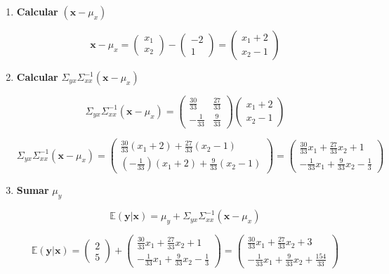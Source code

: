 \begin{enumerate}
    \item \textbf{Calcular }$(\mathbf{x} - \mu_x)$

    $$
    \mathbf{x} - \mu_x = 
    \begin{pmatrix} 
    x_1 \\ 
    x_2 
    \end{pmatrix}
    -
    \begin{pmatrix} 
    -2 \\ 
    1 
    \end{pmatrix}
    =
    \begin{pmatrix} 
    x_1 + 2 \\ 
    x_2 - 1 
    \end{pmatrix}
    $$

    \item \textbf{Calcular } $\Sigma_{yx} \Sigma_{xx}^{-1} (\mathbf{x} - \mu_x)$

    $$
    \Sigma_{yx} \Sigma_{xx}^{-1} (\mathbf{x} - \mu_x) = 
    \begin{pmatrix} 
    \frac{30}{33} & \frac{27}{33} \\ 
    -\frac{1}{33} & \frac{9}{33} 
    \end{pmatrix}
    \begin{pmatrix} 
    x_1 + 2 \\ 
    x_2 - 1 
    \end{pmatrix}
    $$

    $$
    \Sigma_{yx} \Sigma_{xx}^{-1} (\mathbf{x} - \mu_x) = 
    \begin{pmatrix} 
    \frac{30}{33}(x_1+2) + \frac{27}{33}(x_2-1) \\
    (-\frac{1}{33})(x_1+2) + \frac{9}{33}(x_2-1) 
    \end{pmatrix} = 
    \begin{pmatrix} 
    \frac{30}{33} x_1 + \frac{27}{33}x_2 + 1 \\
    -\frac{1}{33}x_1 + \frac{9}{33}x_2 - \frac{1}{3} 
    \end{pmatrix}
    $$

    \item \textbf{Sumar }$\mu_y$

    $$
    \mathbb{E}(\mathbf{y}|\mathbf{x}) = \mu_y + \Sigma_{yx} \Sigma_{xx}^{-1} (\mathbf{x} - \mu_x)
    $$

    $$
    \mathbb{E}(\mathbf{y}|\mathbf{x}) = \begin{pmatrix} 
    2 \\ 
    5 
    \end{pmatrix}
    +
    \begin{pmatrix} 
    \frac{30}{33} x_1 + \frac{27}{33}x_2 + 1 \\
    -\frac{1}{33}x_1 + \frac{9}{33}x_2 - \frac{1}{3} 
    \end{pmatrix} = 
    \begin{pmatrix} 
    \frac{30}{33}x_1 + \frac{27}{33}x_2 + 3 \\ 
    - \frac{1}{33}x_1 + \frac{9}{33}x_2 + \frac{154}{33}
    \end{pmatrix}
    $$

\end{enumerate}


